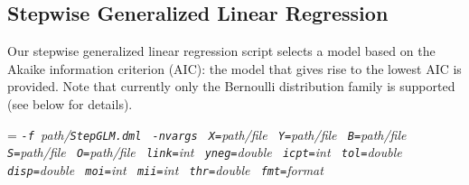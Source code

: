 \begin{comment}

 Licensed to the Apache Software Foundation (ASF) under one
 or more contributor license agreements.  See the NOTICE file
 distributed with this work for additional information
 regarding copyright ownership.  The ASF licenses this file
 to you under the Apache License, Version 2.0 (the
 "License"); you may not use this file except in compliance
 with the License.  You may obtain a copy of the License at

   http://www.apache.org/licenses/LICENSE-2.0

 Unless required by applicable law or agreed to in writing,
 software distributed under the License is distributed on an
 "AS IS" BASIS, WITHOUT WARRANTIES OR CONDITIONS OF ANY
 KIND, either express or implied.  See the License for the
 specific language governing permissions and limitations
 under the License.

\end{comment}

\subsection{Stepwise Generalized Linear Regression}

\smallskip

Our stepwise generalized linear regression script selects a model based on the Akaike information criterion (AIC): the model that gives rise to the lowest AIC is provided. Note that currently only the Bernoulli distribution family is supported (see below for details). \\

\smallskip
{}
\smallskip

{\hangindent=\parindent\noindent\it%
{\tt{}-f }path/\/{\tt{}StepGLM.dml}
{\tt{} -nvargs}
{\tt{} X=}path/file
{\tt{} Y=}path/file
{\tt{} B=}path/file
{\tt{} S=}path/file
{\tt{} O=}path/file
{\tt{} link=}int
{\tt{} yneg=}double
{\tt{} icpt=}int
{\tt{} tol=}double
{\tt{} disp=}double
{\tt{} moi=}int
{\tt{} mii=}int
{\tt{} thr=}double
{\tt{} fmt=}format

}


